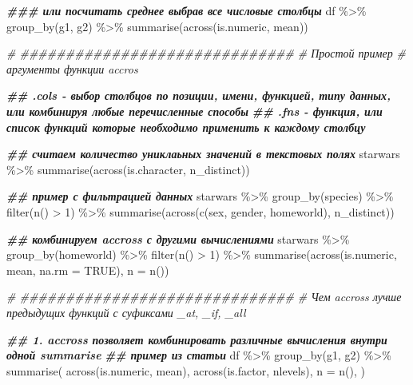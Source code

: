 \documentclass[
]{book}
\newenvironment{Shaded}{\begin{snugshade}}{\end{snugshade}}
\newcommand{\AttributeTok}[1]{\textcolor[rgb]{0.77,0.63,0.00}{#1}}
\newcommand{\CommentTok}[1]{\textcolor[rgb]{0.56,0.35,0.01}{\textit{#1}}}
\newcommand{\ConstantTok}[1]{\textcolor[rgb]{0.00,0.00,0.00}{#1}}
\newcommand{\DecValTok}[1]{\textcolor[rgb]{0.00,0.00,0.81}{#1}}
\newcommand{\DocumentationTok}[1]{\textcolor[rgb]{0.56,0.35,0.01}{\textbf{\textit{#1}}}}
\newcommand{\FunctionTok}[1]{\textcolor[rgb]{0.00,0.00,0.00}{#1}}
\newcommand{\NormalTok}[1]{#1}
\newcommand{\SpecialCharTok}[1]{\textcolor[rgb]{0.00,0.00,0.00}{#1}}
\begin{document}
\begin{Shaded}
\begin{Highlighting}[]
\DocumentationTok{\#\#\# или посчитать среднее выбрав все числовые столбцы }
\NormalTok{df }\SpecialCharTok{\%\textgreater{}\%} 
  \FunctionTok{group\_by}\NormalTok{(g1, g2) }\SpecialCharTok{\%\textgreater{}\%} 
  \FunctionTok{summarise}\NormalTok{(}\FunctionTok{across}\NormalTok{(is.numeric, mean))}

\CommentTok{\# \#\#\#\#\#\#\#\#\#\#\#\#\#\#\#\#\#\#\#\#\#\#\#\#\#\#\#\#\#\#}
\CommentTok{\# Простой пример}
\CommentTok{\# аргументы функции accros}

\DocumentationTok{\#\# .cols {-} выбор столбцов по позиции, имени, функцией, типу данных, или комбинируя любые перечисленные способы}
\DocumentationTok{\#\# .fns {-} функция, или список функций которые необходимо применить к каждому столбцу}

\DocumentationTok{\#\# считаем количество униклаьных значений в текстовых полях}
\NormalTok{starwars }\SpecialCharTok{\%\textgreater{}\%} 
  \FunctionTok{summarise}\NormalTok{(}\FunctionTok{across}\NormalTok{(is.character, n\_distinct))}

\DocumentationTok{\#\# пример с фильтрацией данных}
\NormalTok{starwars }\SpecialCharTok{\%\textgreater{}\%} 
  \FunctionTok{group\_by}\NormalTok{(species) }\SpecialCharTok{\%\textgreater{}\%} 
  \FunctionTok{filter}\NormalTok{(}\FunctionTok{n}\NormalTok{() }\SpecialCharTok{\textgreater{}} \DecValTok{1}\NormalTok{) }\SpecialCharTok{\%\textgreater{}\%} 
  \FunctionTok{summarise}\NormalTok{(}\FunctionTok{across}\NormalTok{(}\FunctionTok{c}\NormalTok{(sex, gender, homeworld), n\_distinct))}

\DocumentationTok{\#\# комбинируем accross с другими вычислениями}
\NormalTok{starwars }\SpecialCharTok{\%\textgreater{}\%} 
  \FunctionTok{group\_by}\NormalTok{(homeworld) }\SpecialCharTok{\%\textgreater{}\%} 
  \FunctionTok{filter}\NormalTok{(}\FunctionTok{n}\NormalTok{() }\SpecialCharTok{\textgreater{}} \DecValTok{1}\NormalTok{) }\SpecialCharTok{\%\textgreater{}\%} 
  \FunctionTok{summarise}\NormalTok{(}\FunctionTok{across}\NormalTok{(is.numeric, mean, }\AttributeTok{na.rm =} \ConstantTok{TRUE}\NormalTok{), }
            \AttributeTok{n =} \FunctionTok{n}\NormalTok{())}

\CommentTok{\# \#\#\#\#\#\#\#\#\#\#\#\#\#\#\#\#\#\#\#\#\#\#\#\#\#\#\#\#\#\#}
\CommentTok{\# Чем accross лучше предыдущих функций с суфиксами \_at, \_if, \_all}

\DocumentationTok{\#\# 1. accross позволяет комбинировать различные вычисления внутри одной summarise }
\DocumentationTok{\#\# пример из статьи}
\NormalTok{df }\SpecialCharTok{\%\textgreater{}\%}
  \FunctionTok{group\_by}\NormalTok{(g1, g2) }\SpecialCharTok{\%\textgreater{}\%} 
  \FunctionTok{summarise}\NormalTok{(}
    \FunctionTok{across}\NormalTok{(is.numeric, mean), }
    \FunctionTok{across}\NormalTok{(is.factor, nlevels),}
    \AttributeTok{n =} \FunctionTok{n}\NormalTok{(), }
\NormalTok{  )}


\end{Highlighting}
\end{Shaded}
\end{document}
